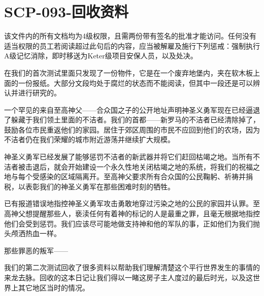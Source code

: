 \section{SCP-093-回收资料}

\label{sec:DOC-scp-093-recovered-materials}

\begin{scpdialog}
\end{scpdialog}

该文件内的所有文档均为4级权限，且需两份带有签名的批准才能访问。任何没有适当权限的员工若阅读超过此句后的内容，应当被解雇及施行下列惩戒：强制执行A级记忆消除，即时移送为Keter级项目安保人员，以及处决。

\begin{scpdialog}
\end{scpdialog}

在我们的首次测试里面只发现了一份物件，它是在一个废弃地堡内，夹在软木板上面的一份报纸。大部分文段均处于腐烂的状态而不能阅读，但其中一段还是可以辨认并进行研究的。

\begin{scpbox}


一个罕见的来自至高神父——合众国之子的公开地址声明神圣义勇军现在已经逼退了躲藏于我们领土里面的不洁者。我们的首都——新罗马的不洁者已经清除掉了，鼓励各位市民重返他们的家园。居住于郊区周围的市民不应回到他们的农场，因为不洁者仍在我们荣耀的城市附近游荡并继续扩大规模。

神圣义勇军已经发展了能够惩罚不洁者的新武器并将它们赶回枯竭之地。当所有不洁者被击退后，就会开始建设一个永久性地关闭枯竭之地的系统，将我们的祝福之地与每个受感染的区域隔离开。至高神父要求所有合众国的公民鞠躬、祈祷并捐税，以表彰我们的神圣义勇军在那些困难时刻的牺牲。

已有报道错误地指控神圣义勇军攻击勇敢地穿过污染之地的公民的家园并认罪。至高神父想提醒那些人，亵渎任何有着神的标记的人是最重之罪，且毫无根据地指控他们会受到惩罚。我们应该尽可能地做支持神和他的军队的事，正如他们为我们抛头颅洒热血一样。

那些罪恶的叛军——

\end{scpbox}

\begin{scpdialog}
\end{scpdialog}

我们的第二次测试回收了很多资料以帮助我们理解清楚这个平行世界发生的事情的来龙去脉。回收的这本日记让我们得以一睹这房子主人度过的最后时光，以及这世界上其它地区当时的情况。

